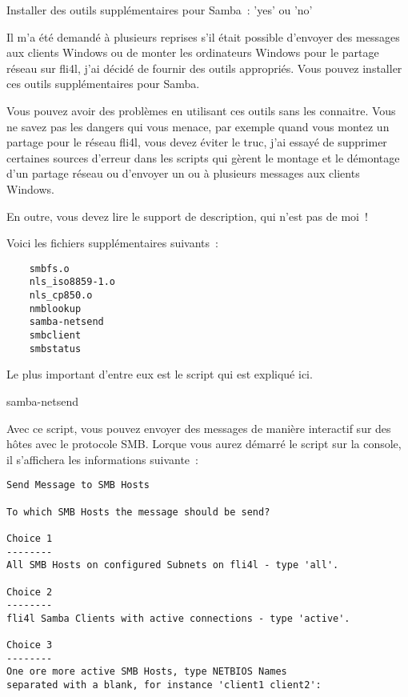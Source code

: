     Installer des outils supplémentaires pour Samba~: 'yes' ou 'no'

    Il m'a été demandé à plusieurs reprises s'il était possible d'envoyer des
    messages aux clients Windows ou de monter les ordinateurs Windows pour le
    partage réseau sur fli4l, j'ai décidé de fournir des outils appropriés. Vous
    pouvez installer ces outils supplémentaires pour Samba.

    Vous pouvez avoir des problèmes en utilisant ces outils sans les connaitre.
    Vous ne savez pas les dangers qui vous menace, par exemple quand vous
    montez un partage pour le réseau fli4l, vous devez éviter le truc, j'ai
	essayé de supprimer certaines sources d'erreur dans les scripts qui gèrent
	le montage et le démontage d'un partage réseau ou d'envoyer un ou à plusieurs
	messages aux clients Windows.

    En outre, vous devez lire le support de description, qui n'est pas de moi~!

    Voici les fichiers supplémentaires suivants~:

\begin{example}
\begin{verbatim}
    smbfs.o
    nls_iso8859-1.o
    nls_cp850.o
    nmblookup
    samba-netsend
    smbclient
    smbstatus
\end{verbatim}
\end{example}

    Le plus important d'entre eux est le script qui est expliqué ici.

    samba-netsend

    Avec ce script, vous pouvez envoyer des messages de manière interactif sur
    des hôtes avec le protocole SMB. Lorque vous aurez démarré le script sur la
    console, il s'affichera les informations suivante~:

\begin{verbatim}
Send Message to SMB Hosts

To which SMB Hosts the message should be send?

Choice 1
--------
All SMB Hosts on configured Subnets on fli4l - type 'all'.

Choice 2
--------
fli4l Samba Clients with active connections - type 'active'.

Choice 3
--------
One ore more active SMB Hosts, type NETBIOS Names
separated with a blank, for instance 'client1 client2':
\end{verbatim}

